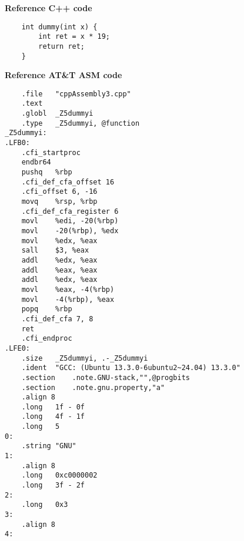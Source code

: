 \documentclass{article}
\begin{document}


{\huge \textbf{Reference C++ code\:}}

\begin{verbatim}
    int dummy(int x) {
        int ret = x * 19;
        return ret;
    }
\end{verbatim}

\vfill
\newpage

{\huge \textbf{Reference AT\&T ASM code\:}}
\begin{verbatim}
	.file	"cppAssembly3.cpp"
	.text
	.globl	_Z5dummyi
	.type	_Z5dummyi, @function
_Z5dummyi:
.LFB0:
	.cfi_startproc
	endbr64
	pushq	%rbp
	.cfi_def_cfa_offset 16
	.cfi_offset 6, -16
	movq	%rsp, %rbp
	.cfi_def_cfa_register 6
	movl	%edi, -20(%rbp)
	movl	-20(%rbp), %edx
	movl	%edx, %eax
	sall	$3, %eax
	addl	%edx, %eax
	addl	%eax, %eax
	addl	%edx, %eax
	movl	%eax, -4(%rbp)
	movl	-4(%rbp), %eax
	popq	%rbp
	.cfi_def_cfa 7, 8
	ret
	.cfi_endproc
.LFE0:
	.size	_Z5dummyi, .-_Z5dummyi
	.ident	"GCC: (Ubuntu 13.3.0-6ubuntu2~24.04) 13.3.0"
	.section	.note.GNU-stack,"",@progbits
	.section	.note.gnu.property,"a"
	.align 8
	.long	1f - 0f
	.long	4f - 1f
	.long	5
0:
	.string	"GNU"
1:
	.align 8
	.long	0xc0000002
	.long	3f - 2f
2:
	.long	0x3
3:
	.align 8
4:

\end{verbatim}

\vfill
\newpage
\end{document}
